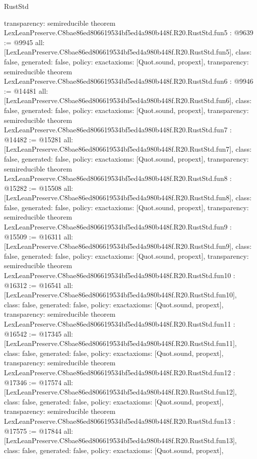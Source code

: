 \begin{lexlean}{RustStd}
\begin{coremodule}
{  transparency: semireducible
}
theorem LexLeanPreserve.C8bae86ed806619534bf5ed4a980b448f.R20.RustStd.fun5 : @9639 := @9945 {
  all: [LexLeanPreserve.C8bae86ed806619534bf5ed4a980b448f.R20.RustStd.fun5],
  class: false,
  generated: false,
  policy: exact{axioms: [Quot.sound, propext]},
  transparency: semireducible
}
theorem LexLeanPreserve.C8bae86ed806619534bf5ed4a980b448f.R20.RustStd.fun6 : @9946 := @14481 {
  all: [LexLeanPreserve.C8bae86ed806619534bf5ed4a980b448f.R20.RustStd.fun6],
  class: false,
  generated: false,
  policy: exact{axioms: [Quot.sound, propext]},
  transparency: semireducible
}
theorem LexLeanPreserve.C8bae86ed806619534bf5ed4a980b448f.R20.RustStd.fun7 : @14482 := @15281 {
  all: [LexLeanPreserve.C8bae86ed806619534bf5ed4a980b448f.R20.RustStd.fun7],
  class: false,
  generated: false,
  policy: exact{axioms: [Quot.sound, propext]},
  transparency: semireducible
}
theorem LexLeanPreserve.C8bae86ed806619534bf5ed4a980b448f.R20.RustStd.fun8 : @15282 := @15508 {
  all: [LexLeanPreserve.C8bae86ed806619534bf5ed4a980b448f.R20.RustStd.fun8],
  class: false,
  generated: false,
  policy: exact{axioms: [Quot.sound, propext]},
  transparency: semireducible
}
theorem LexLeanPreserve.C8bae86ed806619534bf5ed4a980b448f.R20.RustStd.fun9 : @15509 := @16311 {
  all: [LexLeanPreserve.C8bae86ed806619534bf5ed4a980b448f.R20.RustStd.fun9],
  class: false,
  generated: false,
  policy: exact{axioms: [Quot.sound, propext]},
  transparency: semireducible
}
theorem LexLeanPreserve.C8bae86ed806619534bf5ed4a980b448f.R20.RustStd.fun10 : @16312 := @16541 {
  all: [LexLeanPreserve.C8bae86ed806619534bf5ed4a980b448f.R20.RustStd.fun10],
  class: false,
  generated: false,
  policy: exact{axioms: [Quot.sound, propext]},
  transparency: semireducible
}
theorem LexLeanPreserve.C8bae86ed806619534bf5ed4a980b448f.R20.RustStd.fun11 : @16542 := @17345 {
  all: [LexLeanPreserve.C8bae86ed806619534bf5ed4a980b448f.R20.RustStd.fun11],
  class: false,
  generated: false,
  policy: exact{axioms: [Quot.sound, propext]},
  transparency: semireducible
}
theorem LexLeanPreserve.C8bae86ed806619534bf5ed4a980b448f.R20.RustStd.fun12 : @17346 := @17574 {
  all: [LexLeanPreserve.C8bae86ed806619534bf5ed4a980b448f.R20.RustStd.fun12],
  class: false,
  generated: false,
  policy: exact{axioms: [Quot.sound, propext]},
  transparency: semireducible
}
theorem LexLeanPreserve.C8bae86ed806619534bf5ed4a980b448f.R20.RustStd.fun13 : @17575 := @17844 {
  all: [LexLeanPreserve.C8bae86ed806619534bf5ed4a980b448f.R20.RustStd.fun13],
  class: false,
  generated: false,
  policy: exact{axioms: [Quot.sound, propext]},
}
\end{coremodule}
\end{lexlean}
